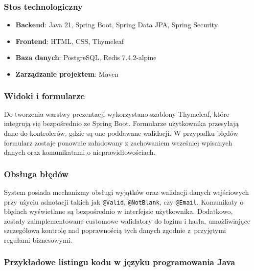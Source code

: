 \documentclass[12pt]{article}
\begin{document}
\subsubsection{Stos technologiczny}
\begin{itemize}
	\item \textbf{Backend}: Java 21, Spring Boot, Spring Data JPA, Spring Security
	\item \textbf{Frontend}: HTML, CSS, Thymeleaf
	\item \textbf{Baza danych}: PostgreSQL, Redis 7.4.2-alpine
	\item \textbf{Zarządzanie projektem}: Maven
\end{itemize}

\subsubsection{Widoki i formularze}
Do tworzenia warstwy prezentacji wykorzystano szablony Thymeleaf, które integrują się bezpośrednio ze Spring Boot. Formularze użytkownika przesyłają dane do kontrolerów, gdzie są one poddawane walidacji. W przypadku błędów formularz zostaje ponownie załadowany z zachowaniem wcześniej wpisanych danych oraz komunikatami o nieprawidłowościach.

\subsubsection{Obsługa błędów}
System posiada mechanizmy obsługi wyjątków oraz walidacji danych wejściowych przy użyciu adnotacji takich jak \texttt{@Valid}, \texttt{@NotBlank}, czy \texttt{@Email}. Komunikaty o błędach wyświetlane są bezpośrednio w interfejsie użytkownika. Dodatkowo, zostały zaimplementowane customowe walidatory do loginu i hasła, umożliwiające szczegółową kontrolę nad poprawnością tych danych zgodnie z~przyjętymi regułami biznesowymi.

\subsubsection{Przykładowe listingu kodu w języku programowania Java}
	
\end{document}
